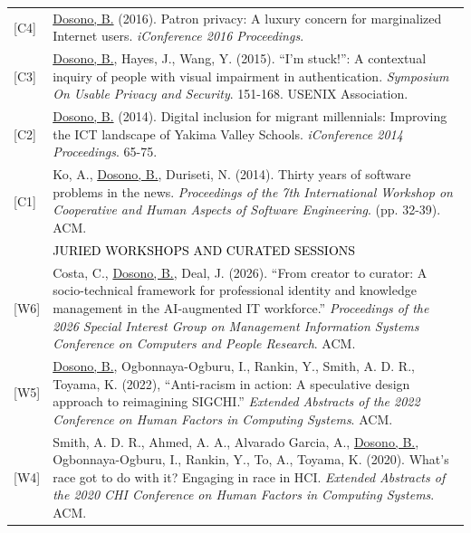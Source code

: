 \documentclass[12pt]{article}
\begin{document}
{\begin{longtable}{R{0.75in}p{5.0in}}
\footnotesize{[C4]} & \href{https://doi.org/10.9776/16285}{Dosono, B.} (2016). Patron privacy: A luxury concern for marginalized Internet users. \textit{iConference 2016 Proceedings}.\\

\footnotesize{[C3]} & \href{https://www.usenix.org/conference/soups2015/proceedings/presentation/dosono}{Dosono, B.}, Hayes, J., Wang, Y. (2015). ``I'm stuck!'': A contextual inquiry of people with visual impairment in authentication. \textit{Symposium On Usable Privacy and Security}. 151-168. USENIX Association.\\

\footnotesize{[C2]} & \href{https://doi.org/10.9776/14043}{Dosono, B.} (2014). Digital inclusion for migrant millennials: Improving the ICT landscape of Yakima Valley Schools. \textit{iConference 2014 Proceedings}. 65-75.\\

\footnotesize{[C1]} & Ko, A., \href{https://dl.acm.org/authorize?N41457}{Dosono, B.}, Duriseti, N. (2014). Thirty years of software problems in the news. \textit{Proceedings of the 7th International Workshop on Cooperative and Human Aspects of Software Engineering}. (pp. 32-39). ACM. \medskip \\

& \large \textcolor{black}{\uppercase{Juried Workshops and Curated Sessions}}\\

\footnotesize{[W6]} & 
Costa, C., \href{https://doi.org/10.1145/3768310.3807787}{Dosono, B.}, Deal, J. (2026). ``From creator to curator: A socio-technical framework for professional identity and knowledge management in the AI‑augmented IT workforce.'' \textit{Proceedings of the 2026 Special Interest Group on Management Information Systems Conference on Computers and People Research}. ACM.\\

\footnotesize{[W5]} & 
\href{https://dl.acm.org/doi/10.1145/3491101.3516504?cid=88158835957}{Dosono, B.}, Ogbonnaya-Ogburu, I., Rankin, Y., Smith, A. D. R., Toyama, K. (2022), ``Anti-racism in action: A speculative design approach to reimagining SIGCHI.'' \textit{Extended Abstracts of the 2022 Conference on Human Factors in Computing Systems}. ACM.\\

\footnotesize{[W4]} & Smith, A. D. R., Ahmed, A. A., Alvarado Garcia, A., \href{https://dl.acm.org/doi/10.1145/3334480.3375156?cid=88158835957}{Dosono, B.}, Ogbonnaya-Ogburu, I., Rankin, Y., To, A., Toyama, K. (2020). What's race got to do with it? Engaging in race in HCI. \textit{Extended Abstracts of the 2020 CHI Conference on Human Factors in Computing Systems}. ACM.\\


\end{longtable}}
\end{document}
